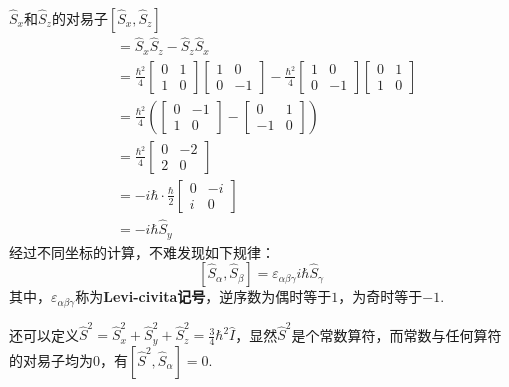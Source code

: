 \begin{extension}{$\hat{S}_x$和$\hat{S}_z$的对易子$[\hat{S}_x,\hat{S}_z]$}
    \begin{align*}
        [\hat{S}_x, \hat{S}_z] &= \hat{S}_x \hat{S}_z - \hat{S}_z \hat{S}_x \\
        &= \frac{\hbar^2}{4} \begin{bmatrix} 0 & 1 \\ 1 & 0 \end{bmatrix} \begin{bmatrix} 1 & 0 \\ 0 & -1 \end{bmatrix} - \frac{\hbar^2}{4} \begin{bmatrix} 1 & 0 \\ 0 & -1 \end{bmatrix} \begin{bmatrix} 0 & 1 \\ 1 & 0 \end{bmatrix} \\
        &= \frac{\hbar^2}{4} \left( \begin{bmatrix} 0 & -1 \\ 1 & 0 \end{bmatrix} - \begin{bmatrix} 0 & 1 \\ -1 & 0 \end{bmatrix} \right) \\
        &= \frac{\hbar^2}{4} \begin{bmatrix} 0 & -2 \\ 2 & 0 \end{bmatrix} \\
        &= -i\hbar \cdot \frac{\hbar}{2} \begin{bmatrix} 0 & -i \\ i & 0 \end{bmatrix} \\
        &= -i\hbar \hat{S}_y
    \end{align*}
    经过不同坐标的计算，不难发现如下规律：
    $$[\hat{S}_\alpha,\hat{S}_\beta] = \varepsilon_{\alpha\beta\gamma} i\hbar\hat{S}_\gamma$$
    其中，$\varepsilon_{\alpha\beta\gamma}$称为\textbf{Levi-civita记号}，逆序数为偶时等于$1$，为奇时等于$-1$.
    
    还可以定义$\hat{S}^2 = \hat{S}_x^2 + \hat{S}_y^2 + \hat{S}_z^2 = \frac{3}{4}\hbar^2\hat{I}$，显然$\hat{S}^2$是个常数算符，而常数与任何算符的对易子均为$0$，有$[\hat{S}^2,\hat{S}_\alpha]=0$.
\end{extension}


